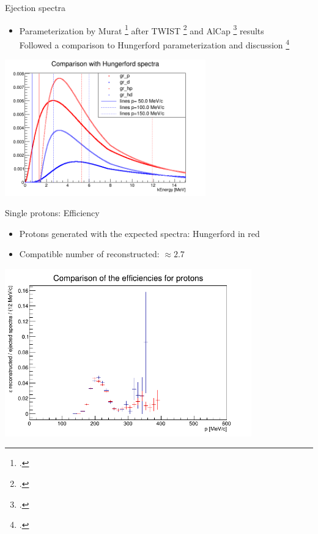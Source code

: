 \documentclass[10pt]{beamer}
\begin{document}
%
\begin{frame}{Ejection spectra}
\begin{itemize}
\item Parameterization by Murat \footcite{Pasha:spectra} after TWIST \footcite{TWIST:2020} and AlCap \footcite{AlCap:2020} results\\
{\small Followed a comparison to Hungerford parameterization and discussion \footcite{io:sobottka}}
\end{itemize}

\begin{center}
\includegraphics[width=0.65\textwidth]{mu2e_spectra_articles/comparison2}
\end{center}
\end{frame}

%
\begin{frame}{Single protons: Efficiency}
\begin{itemize}
\item Protons generated with the expected spectra: Hungerford in red
\item Compatible number of reconstructed: $\approx 2.7$ \textperthousand
\end{itemize}
\begin{center}
\includegraphics[width=0.8\textwidth]{plots/ejected/proton_eff_comparison}
\end{center}
\end{frame}
\end{document}
